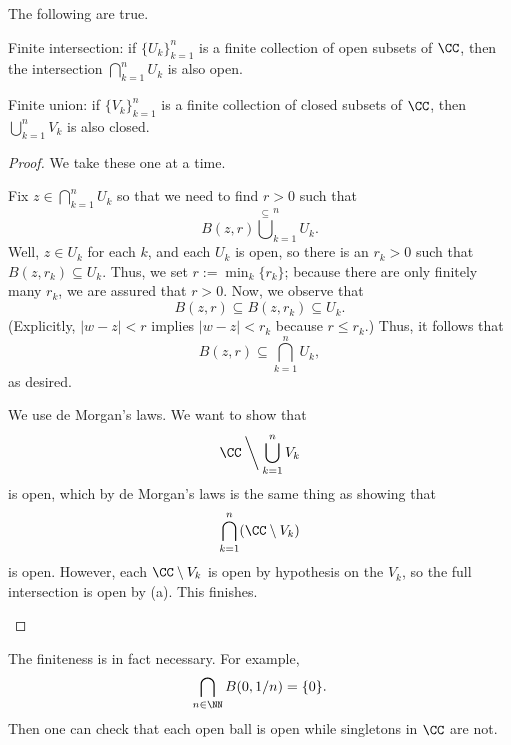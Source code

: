 \begin{lemma}
	The following are true.
	\begin{listalph}
		\item Finite intersection: if $\{U_k\}_{k=1}^n$ is a finite collection of open subsets of $\CC$, then the intersection $\bigcap_{k=1}^nU_k$ is also open.
		\item Finite union: if $\{V_k\}_{k=1}^n$ is a finite collection of closed subsets of $\CC$, then $\bigcup_{k=1}^nV_k$ is also closed.
	\end{listalph}
\end{lemma}
\begin{proof}
	We take these one at a time.
	\begin{listalph}
		\item Fix $z\in\bigcap_{k=1}^nU_k$ so that we need to find $r>0$ such that
		\[B(z,r)\stackrel\subseteq\bigcup_{k=1}^nU_k.\]
		Well, $z\in U_k$ for each $k$, and each $U_k$ is open, so there is an $r_k>0$ such that $B(z,r_k)\subseteq U_k$. Thus, we set $r:=\min_k\{r_k\}$; because there are only finitely many $r_k$, we are assured that $r>0$. Now, we observe that
		\[B(z,r)\subseteq B(z,r_k)\subseteq U_k.\]
		(Explicitly, $|w-z|<r$ implies $|w-z|<r_k$ because $r\le r_k$.) Thus, it follows that
		\[B(z,r)\subseteq\bigcap_{k=1}^nU_k,\]
		as desired.
		\item We use de Morgan's laws. We want to show that
		\[\CC\mathbin{\bigg\backslash}\bigcup_{k=1}^nV_k\]
		is open, which by de Morgan's laws is the same thing as showing that
		\[\bigcap_{k=1}^n(\CC\setminus V_k)\]
		is open. However, each $\CC\setminus V_k$ is open by hypothesis on the $V_k$, so the full intersection is open by (a). This finishes.
		\qedhere
	\end{listalph}
\end{proof}
\begin{remark}
	The finiteness is in fact necessary. For example,
	\[\bigcap_{n\in\NN}B(0,1/n)=\{0\}.\]
	Then one can check that each open ball is open while singletons in $\CC$ are not.
\end{remark}

